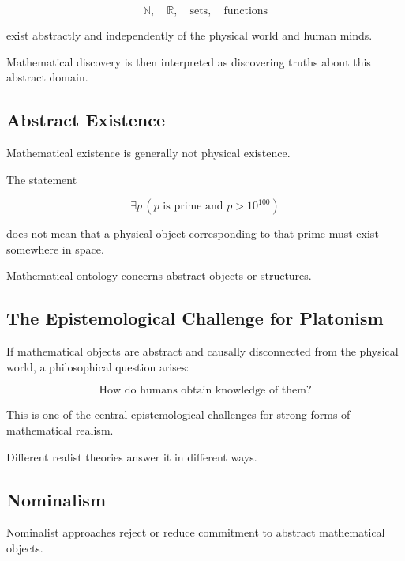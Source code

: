\[
\boxed{
\mathbb{N},
\quad
\mathbb{R},
\quad
\text{sets},
\quad
\text{functions}
}
\]

exist abstractly and independently of the physical world and human minds.

Mathematical discovery is then interpreted as discovering truths about this
abstract domain.

\subsection{Abstract Existence}
\label{subsec:abstract-existence}

Mathematical existence is generally not physical existence.

The statement

\[
\boxed{
\exists p
\,
(p\text{ is prime and }p>10^{100})
}
\]

does not mean that a physical object corresponding to that prime must exist
somewhere in space.

Mathematical ontology concerns abstract objects or structures.

\subsection{The Epistemological Challenge for Platonism}
\label{subsec:platonism-epistemology}

If mathematical objects are abstract and causally disconnected from the
physical world, a philosophical question arises:

\[
\boxed{
\text{How do humans obtain knowledge of them?}
}
\]

This is one of the central epistemological challenges for strong forms of
mathematical realism.

Different realist theories answer it in different ways.

\subsection{Nominalism}
\label{subsec:mathematical-nominalism}

Nominalist approaches reject or reduce commitment to abstract mathematical
objects.


